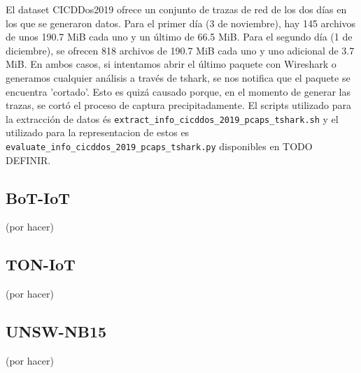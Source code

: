 El dataset CICDDos2019 ofrece un conjunto de trazas de red de los dos días en los que se generaron datos. Para el primer día (3 de noviembre), hay 145 archivos de unos 190.7 MiB cada uno y un último de 66.5 MiB. Para el segundo día (1 de diciembre), se ofrecen 818 archivos de 190.7 MiB cada uno y uno adicional de 3.7 MiB. En ambos casos, si intentamos abrir el último paquete con Wireshark o generamos cualquier análisis a través de tshark, se nos notifica que el paquete se encuentra 'cortado'. Esto es quizá causado porque, en el momento de generar las trazas, se cortó el proceso de captura precipitadamente. El scripts utilizado para la extracción de datos és \texttt{extract\_info\_cicddos\_2019\_pcaps\_tshark.sh} y el utilizado para la representacion de estos es \texttt{evaluate\_info\_cicddos\_2019\_pcaps\_tshark.py} disponibles en TODO DEFINIR.


\subsection{BoT-IoT}

(por hacer)

\subsection{TON-IoT}

(por hacer)

\subsection{UNSW-NB15}

(por hacer)
